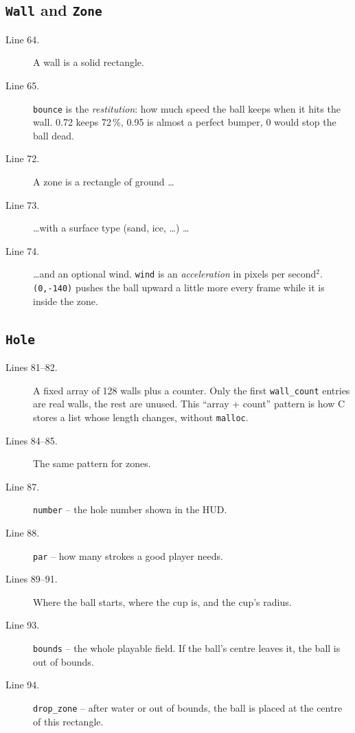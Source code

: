 \documentclass[11pt,a4paper]{article}
\newcommand{\code}[3]{}
\begin{document}
\subsection{\texttt{Wall} and \texttt{Zone}}

\code{types.h}{61}{75}

\begin{description}
  \item[Line 64.] A wall is a solid rectangle.
  \item[Line 65.] \texttt{bounce} is the \emph{restitution}: how much speed the ball keeps when it hits the wall.
  0.72 keeps 72\,\%, 0.95 is almost a perfect bumper, 0 would stop the ball dead.
  \item[Line 72.] A zone is a rectangle of ground \dots
  \item[Line 73.] \dots with a surface type (sand, ice, \dots) \dots
  \item[Line 74.] \dots and an optional wind. \texttt{wind} is an \emph{acceleration} in pixels per second$^2$.
  \texttt{(0,-140)} pushes the ball upward a little more every frame while it is inside the zone.
\end{description}

\subsection{\texttt{Hole}}

\code{types.h}{78}{95}

\begin{description}
  \item[Lines 81--82.] A fixed array of 128 walls plus a counter. Only the first \texttt{wall\_count} entries are
  real walls, the rest are unused. This ``array + count'' pattern is how C stores a list whose length changes,
  without \texttt{malloc}.
  \item[Lines 84--85.] The same pattern for zones.
  \item[Line 87.] \texttt{number} -- the hole number shown in the HUD.
  \item[Line 88.] \texttt{par} -- how many strokes a good player needs.
  \item[Lines 89--91.] Where the ball starts, where the cup is, and the cup's radius.
  \item[Line 93.] \texttt{bounds} -- the whole playable field. If the ball's centre leaves it, the ball is out of bounds.
  \item[Line 94.] \texttt{drop\_zone} -- after water or out of bounds, the ball is placed at the centre of this rectangle.
\end{description}
\end{document}
